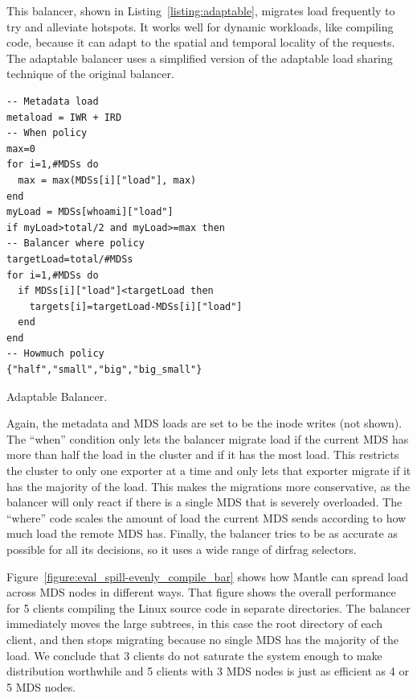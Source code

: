This balancer, shown in Listing~\ref{listing:adaptable}, migrates load frequently to try and alleviate hotspots. It works well for dynamic workloads, like compiling code, because it can adapt to the spatial and temporal locality of the requests. The adaptable balancer uses a simplified version of the adaptable load sharing technique of the original balancer.

\begin{listing}
	\ssp
	\begin{verbatim}
-- Metadata load
metaload = IWR + IRD
-- When policy
max=0
for i=1,#MDSs do
  max = max(MDSs[i]["load"], max)
end
myLoad = MDSs[whoami]["load"]
if myLoad>total/2 and myLoad>=max then
-- Balancer where policy
targetLoad=total/#MDSs
for i=1,#MDSs do
  if MDSs[i]["load"]<targetLoad then
    targets[i]=targetLoad-MDSs[i]["load"]
  end
end
-- Howmuch policy
{"half","small","big","big_small"}
	\end{verbatim}
	\dsp
    \caption{Adaptable Balancer.\label{listing:adaptable}}
\end{listing}

Again, the metadata and MDS loads are set to be the inode writes (not shown). The ``when'' condition only lets the balancer migrate load if the current MDS has more than half the load in the cluster and if it has the most load. This restricts the cluster to only one exporter at a time and only lets that exporter migrate if it has the majority of the load. This makes the migrations more conservative, as the balancer will only react if there is a single MDS that is severely overloaded. The ``where'' code scales the amount of load the current MDS sends according to how much load the remote MDS has. Finally, the balancer tries to be as accurate as possible for all its decisions, so it uses a wide range of dirfrag selectors.

Figure~\ref{figure:eval_spill-evenly_compile_bar} shows how Mantle can spread load across MDS nodes in different ways. That figure shows the overall performance for 5 clients compiling the Linux source code in separate directories. The balancer immediately moves the large subtrees, in this case the root directory of each client, and then stops migrating because no single MDS has the majority of the load. We conclude that 3 clients do not saturate the system enough to make distribution worthwhile and 5 clients with 3 MDS nodes is just as efficient as 4 or 5 MDS nodes. 

